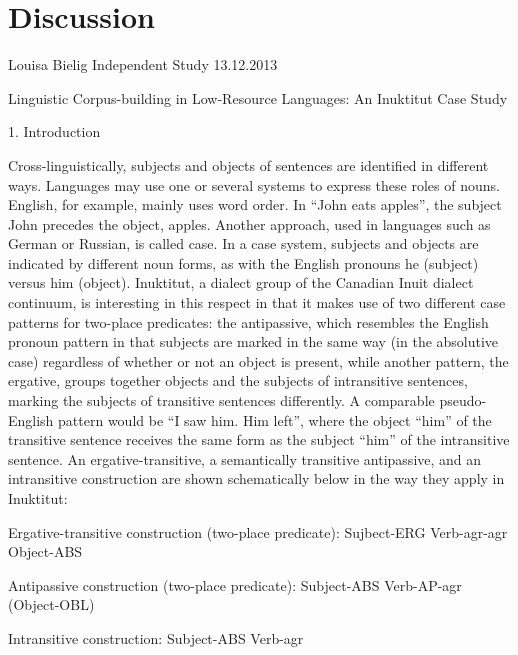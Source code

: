 \documentclass[12pt]{article}
\begin{document}
\section{Discussion} 



Louisa Bielig
Independent Study
13.12.2013

Linguistic Corpus-building in Low-Resource Languages: 
An Inuktitut Case Study


1. Introduction

Cross-linguistically, subjects and objects of sentences are identified in different ways. Languages may use one or several systems to express these roles of nouns. English, for example, mainly uses word order. In “John eats apples”, the subject John precedes the object, apples. Another approach, used in languages such as German or Russian, is called case. In a case system, subjects and objects are indicated by different noun forms, as with the English pronouns he (subject) versus him (object). 
	Inuktitut, a dialect group of the Canadian Inuit dialect continuum, is interesting in this respect in that it makes use of two different case patterns for two-place predicates: the antipassive, which resembles the English pronoun pattern in that subjects are marked in the same way (in the absolutive case) regardless of whether or not an object is present, while another pattern, the ergative, groups together objects and the subjects of intransitive sentences, marking the subjects of transitive sentences differently. A comparable pseudo-English pattern would be “I saw him. Him left”, where the object “him” of the transitive sentence receives the same form as the subject “him” of the intransitive sentence. An ergative-transitive, a semantically transitive antipassive, and an intransitive construction are shown schematically below in the way they apply in Inuktitut:

Ergative-transitive construction (two-place predicate):
Sujbect-ERG Verb-agr-agr Object-ABS

Antipassive construction (two-place predicate):
Subject-ABS Verb-AP-agr (Object-OBL)

Intransitive construction:
Subject-ABS Verb-agr
\end{document}
